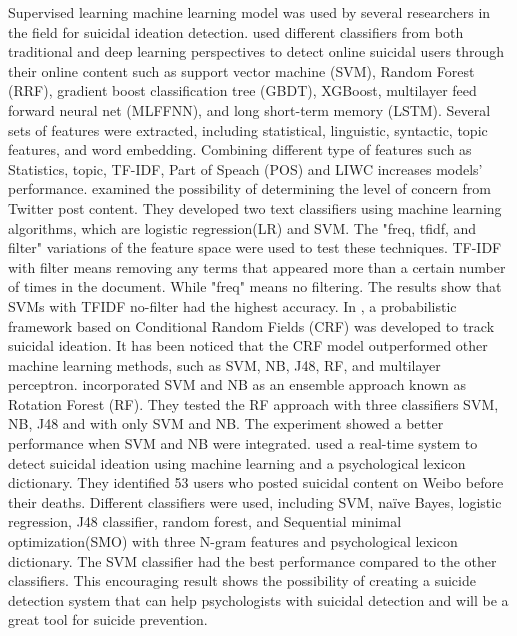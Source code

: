 \documentclass[11pt]{article}
\begin{document}
Supervised learning machine learning model was used by several researchers in the field for suicidal ideation detection. \cite {9ji2018supervised} used different classifiers from both traditional and
deep learning perspectives to detect online suicidal users through their online content such as support vector
machine (SVM), Random Forest (RRF), gradient boost classification tree (GBDT), XGBoost, multilayer feed forward neural net (MLFFNN), and long short-term memory (LSTM). Several sets of features were extracted, including statistical, linguistic, syntactic, topic features, and word embedding. Combining different type of features such as Statistics, topic, TF-IDF, Part of Speach (POS) and LIWC increases models’ performance. \cite{11o2015detecting} examined the possibility of determining the level of concern from Twitter post content. They developed two text classifiers using machine learning algorithms, which are logistic regression(LR) and SVM. The "freq, tfidf, and filter" variations of the feature space were used to test these techniques. TF-IDF with filter means removing any terms that appeared more than a certain number of times in the document. While "freq" means no filtering. The results show that SVMs with TFIDF no-filter had the highest accuracy. In \cite{15moulahi2017dare}, a probabilistic framework based on Conditional Random Fields (CRF) was developed to track suicidal ideation. It has been noticed that the CRF model outperformed other machine learning methods, such as  SVM, NB, J48, RF, and multilayer perceptron. \citet{13burnap2015machine} incorporated SVM and NB as an ensemble approach known as Rotation Forest (RF). They tested the RF approach with three classifiers SVM, NB, J48 and with only SVM and NB. The experiment showed a better performance when SVM and NB were integrated. \cite{31new7307052} used a real-time system to detect suicidal ideation using machine learning and a psychological lexicon dictionary. They identified 53 users who posted suicidal content on Weibo before their deaths. Different classifiers were used, including SVM, naïve Bayes, logistic regression, J48 classifier, random forest, and Sequential minimal optimization(SMO) with three N-gram features and psychological lexicon dictionary. The SVM classifier had the best performance compared to the other classifiers. %
This encouraging result shows the possibility of creating a suicide detection system that can help psychologists with suicidal detection and will be a great tool for suicide prevention. 
\end{document}
